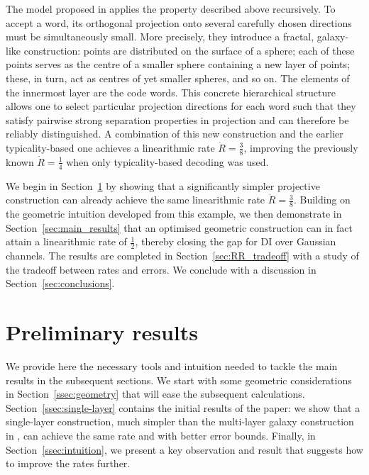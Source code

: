 \documentclass[10pt,conference]{IEEEtran}
\newcommand{\1}{\mathds{1}}
\begin{document}
The model proposed in \cite{galaxy-codes} applies the property described above recursively. To accept a word, its orthogonal projection onto several carefully chosen directions must be simultaneously small. More precisely, they introduce a fractal, galaxy-like construction: points are distributed on the surface of a sphere; each of these points serves as the centre of a smaller sphere containing a new layer of points; these, in turn, act as centres of yet smaller spheres, and so on. The elements of the innermost layer are the code words. This concrete hierarchical structure allows one to select particular projection directions for each word such that they satisfy pairwise strong separation properties in projection and can therefore be reliably distinguished. A combination of this new construction and the earlier typicality-based one achieves a linearithmic rate $\dot R=\frac38$, improving the previously known $\dot R=\frac14$ when only typicality-based decoding was used.

We begin in Section~\ref{sec:pre-results} by showing that a significantly simpler projective construction can already achieve the same linearithmic rate $\dot R=\frac38$. Building on the geometric intuition developed from this example, we then demonstrate in Section~\ref{sec:main_results} that an optimised geometric construction can in fact attain a linearithmic rate of $\frac{1}{2}$, thereby closing the gap for DI over Gaussian channels. The results are completed in Section~\ref{sec:RR_tradeoff} with a study of the tradeoff between rates and errors. We conclude with a discussion in Section~\ref{sec:conclusions}.









\section{Preliminary results}\label{sec:pre-results}
We provide here the necessary tools and intuition needed to tackle the main results in the subsequent sections. We start with some geometric considerations in Section~\ref{ssec:geometry} that will ease the subsequent calculations. Section~\ref{ssec:single-layer} contains the initial results of the paper: we show that a single-layer construction, much simpler than the multi-layer galaxy construction in \cite{galaxy-codes}, can achieve the same rate and with better error bounds. Finally, in Section~\ref{ssec:intuition}, we present a key observation and result that suggests how to improve the rates further.
\end{document}
